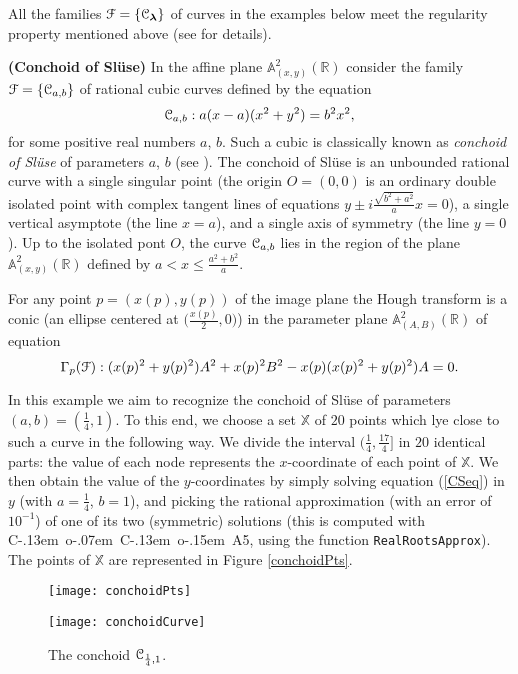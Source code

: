 \documentclass[10pt]{article}
\newcommand\sC{{\cal C}}
\newcommand\sF{{\cal F}}
\newcommand\reals{{\mathbb R}}
\newtheorem{examp}[theorem]{Example}
\def\cocoa{{\hbox{\rm C\kern-.13em o\kern-.07em C\kern-.13em o\kern-.15em A}}}
\newenvironment{example*}{\begin{examp}\em}{\end{examp}}
\begin{document}
{All   the families $\sF=\{\sC_{\bm \lambda}\}$ of curves 
in the examples below meet the regularity property  mentioned above  (see  \cite{etal} for details).



\begin{example*}{\bf (Conchoid of Sl\"use)} 
In the affine plane ${\mathbb A}_{(x,y)}^2(\reals)$ consider the  family $\sF=\{\sC_{a,b}\}$ of  rational cubic curves defined by the equation
\begin{equation}\label{CSeq}
\sC_{a,b} : a(x-a)(x^2+y^2) = b^2x^2,
\end{equation}
for some  positive real numbers $a$, $b$. Such a cubic is classically known as 
 {\it conchoid of Sl\"use} of parameters $a$, $b$ (see \cite[p. 130]{atlas}).
The conchoid of Sl\"use is an unbounded rational curve with a 
single singular point  (the origin $O=(0,0)$ is an ordinary double isolated point 
with complex tangent lines of equations $y\pm i\frac{\sqrt{b^2+a^2}}{a}x=0$), 
a single vertical asymptote (the line $x=a$), and a single axis of symmetry 
(the line $y=0$).  Up to the isolated pont $O$, 
the curve $\sC_{a,b}$ lies in the region of the plane
$ \mathbb A^2_{(x,y)}(\mathbb R)$  defined  by  $a < x \le \frac{a^2+b^2}{a}$.

For any point $p=(x(p), y(p))$ of the image plane the Hough transform is  a conic  (an ellipse centered at $\big(\frac{x(p)}{2}, 0\big)$)
in the parameter plane $\mathbb A^2_{(A,B)}(\mathbb R)$ of equation
$$
\Gamma_p(\sF): (x(p)^2+y(p)^2)A^2 + x(p)^2B^2 - x(p)(x(p)^2+y(p)^2)A=0.
$$

In this example we aim to recognize the conchoid of Sl\"use
of parameters $(a,b)=(\frac{1}{4},1)$. To this end, we choose a set $\mathbb X$ 
of $20$ points which lye close to such a curve in the following way. 
We divide the interval $(\frac{1}{4}, \frac{17}{4}]$
in $20$  identical parts: the value of each node represents the $x$-coordinate 
of each point of $\mathbb X$. We then obtain the value of the $y$-coordinates 
by simply solving equation (\ref{CSeq}) in $y$ (with $a=\frac{1}{4}$, $b=1$), 
and picking the rational approximation (with an error of $10^{-1}$) of one of 
its two (symmetric) solutions (this is computed with \cocoa 5, 
using the function {\tt RealRootsApprox}). 
The points of $\mathbb X$ are represented in Figure \ref{conchoidPts}.
\begin{figure}[htb]
\centering
\begin{minipage}[c]{0.48\textwidth}
\texttt{[image: conchoidPts]}
\caption{\small{The set  $\mathbb X$ of selected points.}}\label{conchoidPts}
\end{minipage}%
\hspace{0.3cm}
\begin{minipage}[c]{0.48\textwidth}
\texttt{[image: conchoidCurve]}
\caption{\small{The conchoid  $\sC_{\frac{1}{4}, 1}$.}}\label{conchoidCurve}
\end{minipage}
\end{figure}


\end{example*}}
\end{document}
